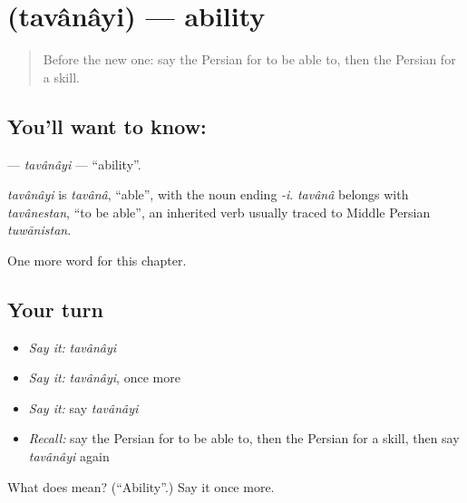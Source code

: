 \section[\texorpdfstring{\fa{توانایی} (tavânâyi)}{توانایی (tavânâyi)}]{ (tavânâyi) — ability}

\label{lesson:FA-C89-tavanayi}



\begin{quote}
Before the new one: say the Persian for to be able to, then the Persian for a skill.
\end{quote}

\subsection*{You'll want to know: }
\textbf{} — \emph{tavânâyi} — \textquotedblleft{}ability\textquotedblright{}.

\begin{cousinweb}
\emph{tavânâyi} is \emph{tavânâ}, \textquotedblleft{}able\textquotedblright{}, with the noun ending \emph{-i}. \emph{tavânâ} belongs with \emph{tavânestan}, \textquotedblleft{}to be able\textquotedblright{}, an inherited verb usually traced to Middle Persian \emph{tuwānistan}.
\end{cousinweb}

\begin{grammarlens}[title={What you've built}]
One more word for this chapter.
\end{grammarlens}

\subsection*{Your turn}
\begin{itemize}
\raggedright
  \item \emph{Say it:} \emph{tavânâyi}
  \item \emph{Say it:} \emph{tavânâyi}, once more
  \item \emph{Say it:} say \emph{tavânâyi}
  \item \emph{Recall:} say the Persian for to be able to, then the Persian for a skill, then say \emph{tavânâyi} again
\end{itemize}

\begin{tcolorbox}[breakable,colback=teal!4,colframe=teal!35!black,title={Before you move on}]
What does  mean? (\textquotedblleft{}Ability\textquotedblright{}.) Say it once more.
\end{tcolorbox}
